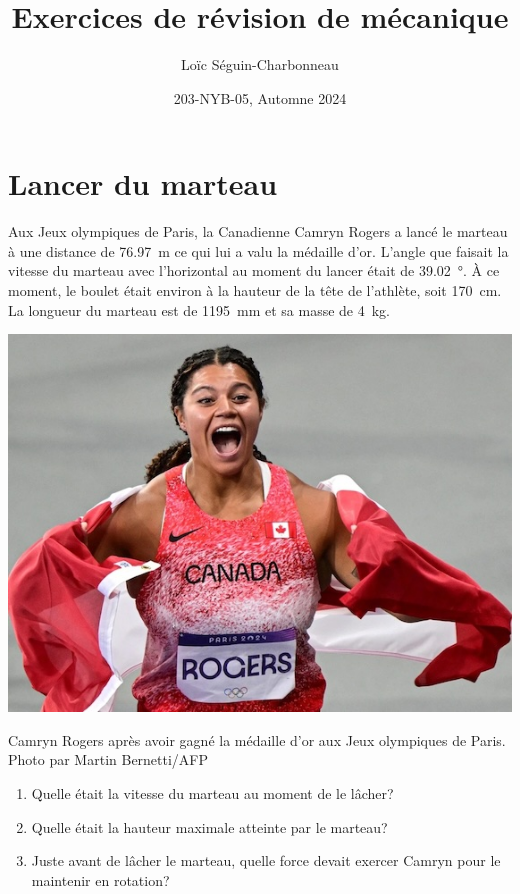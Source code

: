 \documentclass[nofonts]{tufte-handout}
\title{Exercices de révision de mécanique}
\author{Loïc Séguin-Charbonneau}
\date{203-NYB-05, Automne 2024}
\begin{document}
\maketitle

\section{Lancer du marteau}

Aux Jeux olympiques de Paris, la Canadienne Camryn Rogers a lancé le marteau à
une distance de \qty{76.97}{\meter} ce qui lui a valu la médaille d'or. L'angle
que faisait la vitesse du marteau avec l'horizontal au moment du lancer était
de \qty{39.02}{\degree}. À ce moment, le boulet était environ à la
hauteur de la tête de l'athlète, soit \qty{170}{\centi\meter}. La longueur du marteau est
de \qty{1195}{\milli\meter} et sa masse de \qty{4}{\kilo\gram}.
\begin{marginfigure}
  \includegraphics[width=\marginparwidth]{figures/camryn_rogers.jpg}
  \caption{Camryn Rogers après avoir gagné la médaille d'or aux Jeux olympiques
  de Paris. Photo par Martin Bernetti/AFP}
\end{marginfigure}

\begin{enumerate}[label=\alph*)]
  \item Quelle était la vitesse du marteau au moment de le lâcher?
  \item Quelle était la hauteur maximale atteinte par le marteau?
  \item Juste avant de lâcher le marteau, quelle force devait exercer Camryn
    pour le maintenir en rotation?
\end{enumerate}
\end{document}
